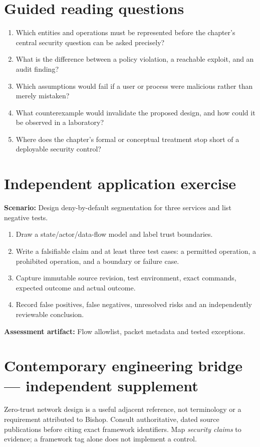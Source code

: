 \documentclass[10pt,letterpaper]{article}
\begin{document}
\section{Guided reading questions}
\begin{enumerate}
\item Which entities and operations must be represented before the chapter's central security question can be asked precisely?
\item What is the difference between a policy violation, a reachable exploit, and an audit finding?
\item Which assumptions would fail if a user or process were malicious rather than merely mistaken?
\item What counterexample would invalidate the proposed design, and how could it be observed in a laboratory?
\item Where does the chapter's formal or conceptual treatment stop short of a deployable security control?
\end{enumerate}
\section{Independent application exercise}
\textbf{Scenario:} Design deny-by-default segmentation for three services and list negative tests.
\begin{enumerate}
\item Draw a state/actor/data-flow model and label trust boundaries.
\item Write a falsifiable claim and at least three test cases: a permitted operation, a prohibited operation, and a boundary or failure case.
\item Capture immutable source revision, test environment, exact commands, expected outcome and actual outcome.
\item Record false positives, false negatives, unresolved risks and an independently reviewable conclusion.
\end{enumerate}
\textbf{Assessment artifact:} Flow allowlist, packet metadata and tested exceptions.
\section{Contemporary engineering bridge --- independent supplement}
Zero-trust network design is a useful adjacent reference, not terminology or a requirement attributed to Bishop. Consult authoritative, dated source publications before citing exact framework identifiers. Map \emph{security claims} to evidence; a framework tag alone does not implement a control.
\end{document}
